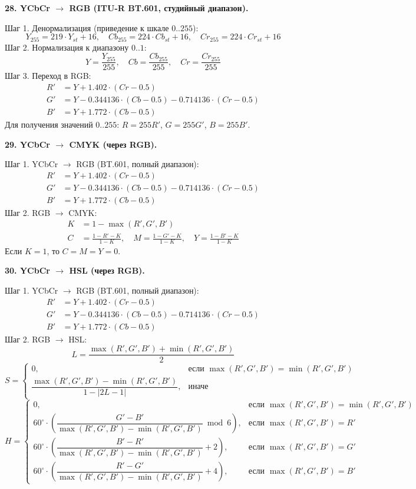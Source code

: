 \documentclass[12pt,a4paper]{article}
\begin{document}
\textbf{28. YCbCr \(\to\) RGB (ITU-R BT.601, студийный диапазон).}

Шаг 1. Денормализация (приведение к шкале \(0..255\)):
\[
Y_{255} = 219 \cdot Y_{st} + 16,\quad Cb_{255} = 224 \cdot Cb_{st} + 16,\quad Cr_{255} = 224 \cdot Cr_{st} + 16
\]
Шаг 2. Нормализация к диапазону \(0..1\):
\[
Y = \frac{Y_{255}}{255},\quad Cb = \frac{Cb_{255}}{255},\quad Cr = \frac{Cr_{255}}{255}
\]
Шаг 3. Переход в RGB:
\begin{align*}
R' &= Y + 1.402 \cdot (Cr - 0.5) \\
G' &= Y - 0.344136 \cdot (Cb - 0.5) - 0.714136 \cdot (Cr - 0.5) \\
B' &= Y + 1.772 \cdot (Cb - 0.5)
\end{align*}
Для получения значений \(0..255\): \(R = 255 R'\), \(G = 255 G'\), \(B = 255 B'\).

\textbf{29. YCbCr \(\to\) CMYK (через RGB).}

Шаг 1. YCbCr \(\to\) RGB (BT.601, полный диапазон):
\begin{align*}
R' &= Y + 1.402 \cdot (Cr - 0.5) \\
G' &= Y - 0.344136 \cdot (Cb - 0.5) - 0.714136 \cdot (Cr - 0.5) \\
B' &= Y + 1.772 \cdot (Cb - 0.5)
\end{align*}
Шаг 2. RGB \(\to\) CMYK:
\begin{align*}
K &= 1 - \max(R', G', B') \\
C &= \frac{1 - R' - K}{1 - K},\quad M = \frac{1 - G' - K}{1 - K},\quad Y = \frac{1 - B' - K}{1 - K}
\end{align*}
Если \(K = 1\), то \(C = M = Y = 0\).

\textbf{30. YCbCr \(\to\) HSL (через RGB).}

Шаг 1. YCbCr \(\to\) RGB (BT.601, полный диапазон):
\begin{align*}
R' &= Y + 1.402 \cdot (Cr - 0.5) \\
G' &= Y - 0.344136 \cdot (Cb - 0.5) - 0.714136 \cdot (Cr - 0.5) \\
B' &= Y + 1.772 \cdot (Cb - 0.5)
\end{align*}
Шаг 2. RGB \(\to\) HSL:
\[
L = \frac{\max(R', G', B') + \min(R', G', B')}{2}
\]
\[
S = \begin{cases}
0, & \text{если } \max(R', G', B') = \min(R', G', B') \\[8pt]
\dfrac{\max(R', G', B') - \min(R', G', B')}{1 - |2L - 1|}, & \text{иначе}
\end{cases}
\]
\[
H = \begin{cases}
0, & \text{если } \max(R', G', B') = \min(R', G', B') \\[8pt]
60^\circ \cdot \left( \dfrac{G' - B'}{\max(R', G', B') - \min(R', G', B')} \bmod 6 \right), & \text{если } \max(R', G', B') = R' \\[12pt]
60^\circ \cdot \left( \dfrac{B' - R'}{\max(R', G', B') - \min(R', G', B')} + 2 \right), & \text{если } \max(R', G', B') = G' \\[12pt]
60^\circ \cdot \left( \dfrac{R' - G'}{\max(R', G', B') - \min(R', G', B')} + 4 \right), & \text{если } \max(R', G', B') = B'
\end{cases}
\]
\end{document}
